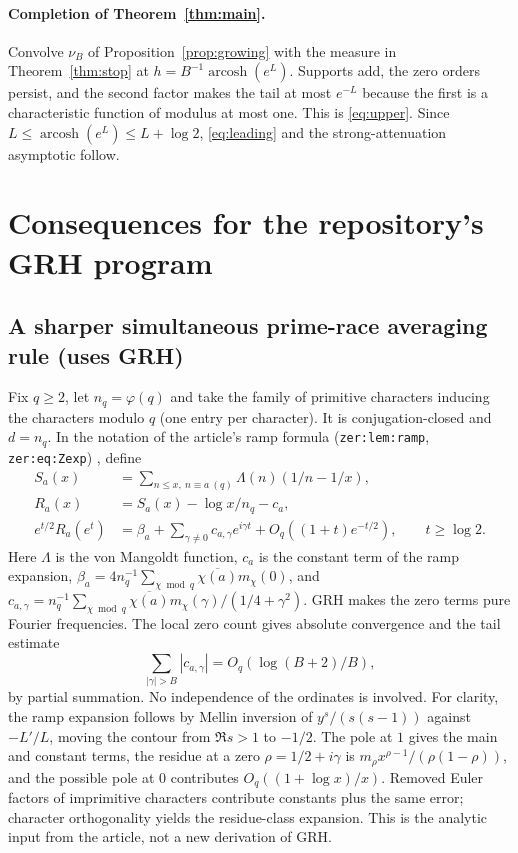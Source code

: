 \documentclass[11pt]{article}
\theoremstyle{remark}\newtheorem{remark}[theorem]{Remark}
\newcommand{\arcosh}{\operatorname{arcosh}}\newcommand{\ord}{\operatorname{ord}}
\begin{document}
\paragraph{Completion of Theorem~\ref{thm:main}.} Convolve $\nu_B$ of Proposition~\ref{prop:growing} with the measure in Theorem~\ref{thm:stop} at $h=B^{-1}\arcosh(e^L)$. Supports add, the zero orders persist, and the second factor makes the tail at most $e^{-L}$ because the first is a characteristic function of modulus at most one. This is \eqref{eq:upper}. Since $L\le\arcosh(e^L)\le L+\log2$, \eqref{eq:leading} and the strong-attenuation asymptotic follow.

\section{Consequences for the repository's GRH program}
\subsection*{A sharper simultaneous prime-race averaging rule (uses GRH)}
Fix $q\ge2$, let $n_q=\varphi(q)$ and take the family of primitive characters inducing the characters modulo $q$ (one entry per character). It is conjugation-closed and $d=n_q$. In the notation of the article's ramp formula (\texttt{zer:lem:ramp}, \texttt{zer:eq:Zexp}) \cite{zer}, define
\begin{align*}
 S_a(x)&=\sum_{n\le x,\ n\equiv a\ (q)}\Lambda(n)(1/n-1/x),\\
 R_a(x)&=S_a(x)-\log x/n_q-c_a,\\
 e^{t/2}R_a(e^t)&=\beta_a+\sum_{\gamma\ne0}c_{a,\gamma}e^{i\gamma t}
       +O_q((1+t)e^{-t/2}),\qquad t\ge\log2.
\end{align*}
Here $\Lambda$ is the von Mangoldt function, $c_a$ is the constant term of the ramp expansion, $\beta_a=4n_q^{-1}\sum_{\chi\bmod q}\overline{\chi(a)}m_\chi(0)$, and $c_{a,\gamma}=n_q^{-1}\sum_{\chi\bmod q}\overline{\chi(a)}m_\chi(\gamma)/(1/4+\gamma^2)$. GRH makes the zero terms pure Fourier frequencies. The local zero count gives absolute convergence and the tail estimate
\[
 \sum_{|\gamma|>B}|c_{a,\gamma}|=O_q(\log(B+2)/B),
\]
by partial summation. No independence of the ordinates is involved. For clarity, the ramp expansion follows by Mellin inversion of $y^s/(s(s-1))$ against $-L'/L$, moving the contour from $\Re s>1$ to $-1/2$. The pole at $1$ gives the main and constant terms, the residue at a zero $\rho=1/2+i\gamma$ is $m_\rho x^{\rho-1}/(\rho(1-\rho))$, and the possible pole at $0$ contributes $O_q((1+\log x)/x)$. Removed Euler factors of imprimitive characters contribute constants plus the same error; character orthogonality yields the residue-class expansion. This is the analytic input from the article, not a new derivation of GRH.
\end{document}
